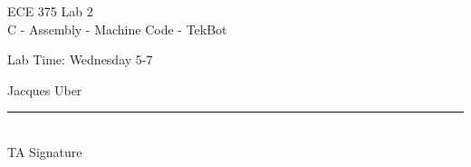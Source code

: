 \documentclass[12pt,letterpaper]{article}
\begin{document}
\begin{titlepage}
    \vspace*{4cm}
    \begin{flushright}
    {\huge
        ECE 375 Lab 2\\[1cm]
    }
    {\large
        C - Assembly - Machine Code - TekBot
    }
    \end{flushright}
    \begin{flushleft}
    Lab Time: Wednesday 5-7
    \end{flushleft}
    \begin{flushright}
    Jacques Uber
    \vfill
    \rule{5in}{.5mm}\\
    TA Signature
    \end{flushright}

\end{titlepage}
\end{document}
